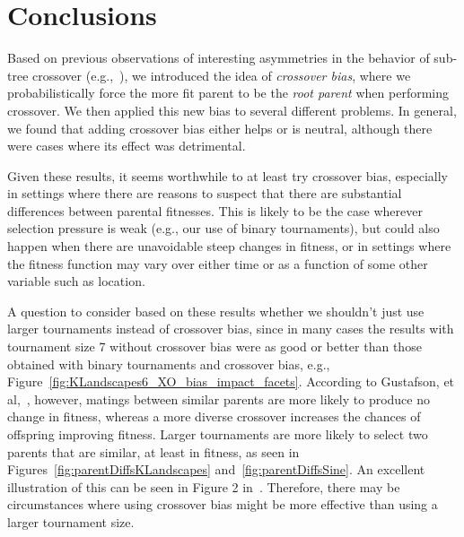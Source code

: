\documentclass{sig-alternate}
\begin{document}

\section{Conclusions} \label{sec:Conclusions}

Based on previous observations of interesting asymmetries in the behavior of sub-tree crossover
(e.g.,~\cite{McPheeDonatucciDramdahl:2014}), we introduced the idea of \emph{crossover bias}, where we
probabilistically force the more fit parent to be the \emph{root parent} when performing crossover. We then applied
this new bias to several different problems. In general, we found that adding crossover bias either
helps or is neutral, although there were cases where its effect was detrimental.

Given these results, it seems worthwhile to at least try crossover bias, especially in settings where there are reasons
to suspect that there are substantial differences between parental fitnesses. This is likely to be the case wherever
selection pressure is weak (e.g., our use of binary tournaments), but could also happen when there are unavoidable
steep changes in fitness, or in settings where the fitness function may vary over either time or as a function of some
other variable such as location.

A question to consider based on these results whether we shouldn't just use larger tournaments 
instead of crossover bias, since in many cases the results with tournament size 7 without crossover bias
were as good or better than those obtained with binary tournaments and crossover bias, 
e.g., Figure~\ref{fig:KLandscapes6_XO_bias_impact_facets}. 
According to Gustafson, et al,~\cite{Gustafson:2005}, however, matings between similar parents are more likely 
to produce no change in fitness, whereas a more diverse crossover increases the chances of offspring 
improving fitness. Larger tournaments are more likely to select two parents that are similar, at 
least in fitness, as seen in Figures~\ref{fig:parentDiffsKLandscapes} and~\ref{fig:parentDiffsSine}. 
An excellent illustration of this can be seen in Figure 2 in~\cite{Boetticher:2006}. Therefore, 
there may be circumstances where using crossover bias might be more effective than using 
a larger tournament size. 
\end{document}

